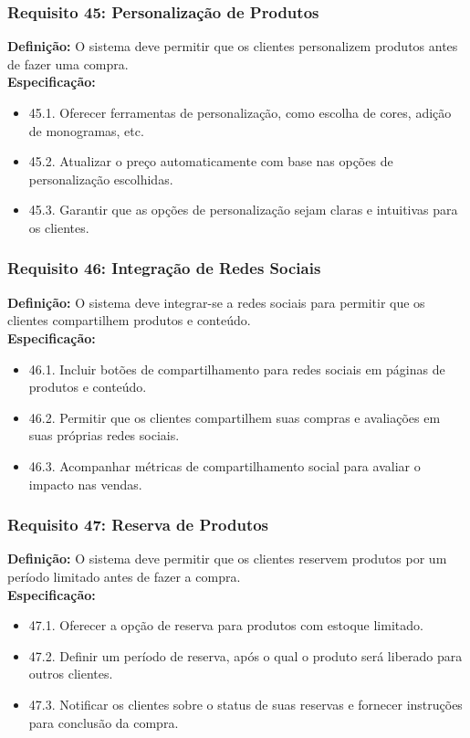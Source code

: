 \subsubsection{Requisito 45: Personalização de Produtos}
\textbf{Definição:} O sistema deve permitir que os clientes personalizem produtos antes de fazer uma compra.
\\
\textbf{Especificação:}
\begin{itemize}
	\item 45.1. Oferecer ferramentas de personalização, como escolha de cores, adição de monogramas, etc.
	\item 45.2. Atualizar o preço automaticamente com base nas opções de personalização escolhidas.
	\item 45.3. Garantir que as opções de personalização sejam claras e intuitivas para os clientes.
\end{itemize}

\subsubsection{Requisito 46: Integração de Redes Sociais}
\textbf{Definição:} O sistema deve integrar-se a redes sociais para permitir que os clientes compartilhem produtos e conteúdo.
\\
\textbf{Especificação:}
\begin{itemize}
	\item 46.1. Incluir botões de compartilhamento para redes sociais em páginas de produtos e conteúdo.
	\item 46.2. Permitir que os clientes compartilhem suas compras e avaliações em suas próprias redes sociais.
	\item 46.3. Acompanhar métricas de compartilhamento social para avaliar o impacto nas vendas.
\end{itemize}

\subsubsection{Requisito 47: Reserva de Produtos}
\textbf{Definição:} O sistema deve permitir que os clientes reservem produtos por um período limitado antes de fazer a compra.
\\
\textbf{Especificação:}
\begin{itemize}
	\item 47.1. Oferecer a opção de reserva para produtos com estoque limitado.
	\item 47.2. Definir um período de reserva, após o qual o produto será liberado para outros clientes.
	\item 47.3. Notificar os clientes sobre o status de suas reservas e fornecer instruções para conclusão da compra.
\end{itemize}

